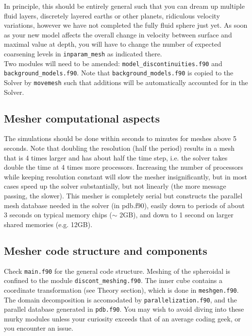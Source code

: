 \documentclass[11pt,letter,fleqn,english,notitlepage]{article}
\begin{document}
\noindent In principle, this should be entirely general such that you can dream up multiple fluid layers,
discretely layered earths or other planets, ridiculous velocity variations, 
however we have not completed the fully fluid sphere just yet. As soon as your new 
model affects the overall change in velocity between surface and maximal value at depth, you 
will have to change the number of expected coarsening levels in {\tt inparam\_mesh} as indicated there.\\

\noindent Two modules will need to be amended: {\tt model\_discontinuities.f90} and {\tt background\_models.f90}.
Note that {\tt background\_models.f90} is copied to the Solver by {\tt movemesh} 
such that additions will be automatically accounted for in the Solver. 

\subsection{Mesher computational aspects}
The simulations should be done within seconds to minutes for meshes above 5 seconds.
Note that doubling the resolution (half the period) results in a mesh that 
is 4 times larger and has about half the time step, i.e. the solver takes 
double the time at 4 times more processors. Increasing the number of 
processors while keeping resolution constant will slow the mesher insignificantly, 
but in most cases speed up the solver substantially, but not linearly
(the more message passing, the slower).
This mesher is completely serial but constructs the parallel mesh database 
needed in the solver (in pdb.f90), easily down to periods of about 
3 seconds on typical memory chips ($\sim$ 2GB), and down to 1 second on 
larger shared memories (e.g. 12GB).

\subsection{Mesher code structure and components}
Check {\tt main.f90} for the general code structure. Meshing of the spheroidal is confined to the module 
{\tt discont\_meshing.f90}. The inner cube contains a coordinate transformation (see Theory section), which 
is done in {\tt meshgen.f90}. The domain decomposition is accomodated by {\tt parallelization.f90}, and the 
parallel database generated in {\tt pdb.f90}. You may wish to avoid diving into these murky modules 
unless your curiosity exceeds that of an average coding geek, or you encounter an issue.\\
\end{document}
